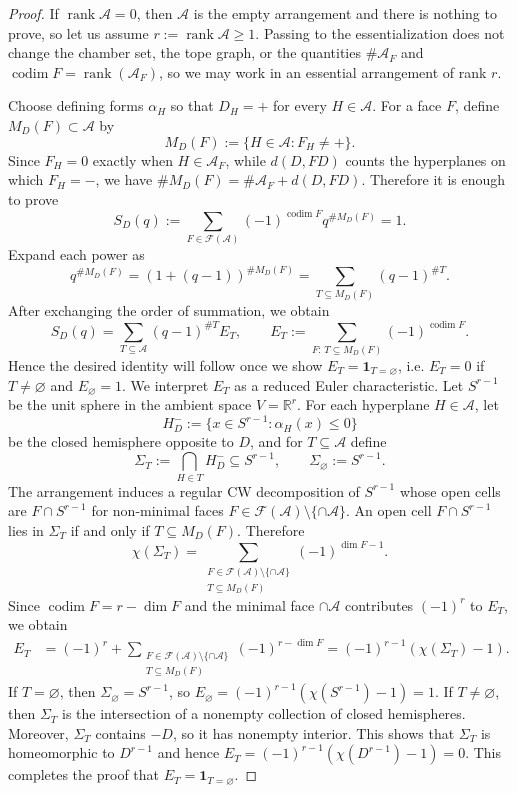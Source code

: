\documentclass{amsart}
\numberwithin{equation}{section}
\theoremstyle{plain}
\theoremstyle{remark}
\theoremstyle{definition}
\numberwithin{equation}{section}
\newcommand{\A}{\mathcal{A}}
\newcommand{\FF}{\mathcal{F}}
\newcommand{\R}{\mathbb{R}}
\DeclareMathOperator{\rank}{rank}
\DeclareMathOperator{\codim}{codim}
\begin{document}
\begin{proof}
If $\rank \A=0$, then $\A$ is the empty arrangement and there is nothing to prove, so let us assume $r:=\rank \A\ge 1$. Passing to the essentialization does not change the chamber set, the tope graph, or the quantities $\#\A_F$ and $\codim F=\rank(\A_F)$, so we may work in an essential arrangement of rank $r$.

Choose defining forms $\alpha_H$ so that $D_H=+$ for every $H\in \A$.
For a face $F$, define $M_D(F)\subset \A$ by
\[
M_D(F):=\{H\in \A: F_H\neq +\}.
\]
Since $F_H=0$ exactly when $H\in \A_F$, while $d(D,FD)$ counts the hyperplanes on which $F_H=-$, we have $\#M_D(F)=\#\A_F+d(D,FD)$.
Therefore it is enough to prove
\[
S_D(q):=\sum_{F\in \FF(\A)}(-1)^{\codim F}q^{\#M_D(F)}=1.
\]
Expand each power as
\[
q^{\#M_D(F)}=(1+(q-1))^{\#M_D(F)}
=\sum_{T\subseteq M_D(F)}(q-1)^{\#T}.
\]
After exchanging the order of summation, we obtain
\[
S_D(q)=\sum_{T\subseteq \A}(q-1)^{\#T}E_T,
\qquad
E_T:=\sum_{F:\,T\subseteq M_D(F)}(-1)^{\codim F}.
\]
Hence the desired identity will follow once we show $E_T=\mathbf{1}_{T=\varnothing}$, i.e. $E_T=0$ if $T\neq\varnothing$ and $E_{\varnothing}=1$.
We interpret $E_T$ as a reduced Euler characteristic. Let $S^{r-1}$ be the unit sphere in the ambient space $V=\R^r$. For each hyperplane $H\in \A$, let
\[
H_D^-:=\{x\in S^{r-1}:\alpha_H(x)\le 0\}
\]
be the closed hemisphere opposite to $D$, and for $T\subseteq \A$ define
\[
\Sigma_T:=\bigcap_{H\in T}H_D^- \subseteq S^{r-1},
\qquad
\Sigma_{\varnothing}:=S^{r-1}.
\]
The arrangement induces a regular CW decomposition of $S^{r-1}$ whose open cells are $F\cap S^{r-1}$ for non-minimal faces $F\in \FF(\A)\setminus\{\cap \A\}$.
An open cell $F\cap S^{r-1}$ lies in $\Sigma_T$ if and only if $T\subseteq M_D(F)$. Therefore
\[
\chi(\Sigma_T)
=\sum_{\substack{F\in \FF(\A)\setminus\{\cap \A\}\\ T\subseteq M_D(F)}}(-1)^{\dim F-1}.
\]
Since $\codim F=r-\dim F$ and the minimal face $\cap \A$ contributes $(-1)^r$ to $E_T$, we obtain
\begin{align*}
E_T
&=(-1)^r+\sum_{\substack{F\in \FF(\A)\setminus\{\cap \A\}\\ T\subseteq M_D(F)}}(-1)^{r-\dim F}
=(-1)^{r-1}\left(\chi(\Sigma_T)-1\right).
\end{align*}
If $T=\varnothing$, then $\Sigma_{\varnothing}=S^{r-1}$, so $E_{\varnothing}=(-1)^{r-1}(\chi(S^{r-1})-1)=1$.
If $T\neq\varnothing$, then $\Sigma_T$ is the intersection of a nonempty collection of closed hemispheres.
Moreover, $\Sigma_T$ contains $-D$, so it has nonempty interior.
This shows that $\Sigma_T$ is homeomorphic to $D^{r-1}$ and hence
$E_T=(-1)^{r-1}(\chi(D^{r-1})-1)=0$.
This completes the proof that $E_T=\mathbf{1}_{T=\varnothing}$.
\end{proof}
\end{document}
